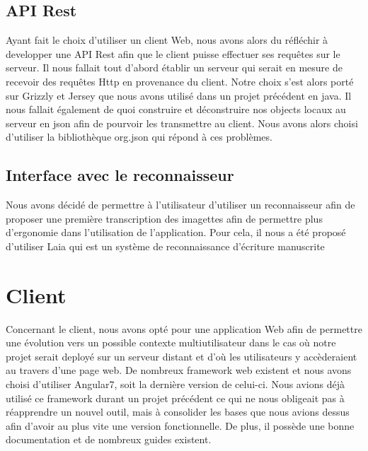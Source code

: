\subsection{API Rest}

Ayant fait le choix d'utiliser un client Web, nous avons alors du réfléchir à developper une API Rest afin que le client puisse effectuer ses requêtes sur le serveur. Il nous fallait tout d'abord établir un serveur qui serait en mesure de recevoir des requêtes Http en provenance du client. Notre choix s'est alors porté sur Grizzly et Jersey que nous avons utilisé dans un projet précédent en java. Il nous fallait également de quoi construire et déconstruire nos objects locaux au serveur en json afin de pourvoir les transmettre au client. Nous avons alors choisi d'utiliser la bibliothèque org.json qui répond à ces problèmes.

\subsection{Interface avec le reconnaisseur}

Nous avons décidé de permettre à l'utilisateur d'utiliser un reconnaisseur afin de proposer une première transcription des imagettes afin de permettre plus d'ergonomie dans l'utilisation de l'application. Pour cela, il nous a été proposé d'utiliser Laia qui est un système de reconnaissance d'écriture manuscrite

\section{Client}

Concernant le client, nous avons opté pour une application Web afin de permettre une évolution vers un possible contexte multiutilisateur dans le cas où notre projet serait deployé sur un serveur distant et d'où les utilisateurs y accèderaient au travers d'une page web. De nombreux framework web existent et nous avons choisi d'utiliser Angular7, soit la dernière version de celui-ci. Nous avions déjà utilisé ce framework durant un projet précédent ce qui ne nous obligeait pas à réapprendre un nouvel outil, mais à consolider les bases que nous avions dessus afin d'avoir au plus vite une version fonctionnelle. De plus, il possède une bonne documentation et de nombreux guides existent.